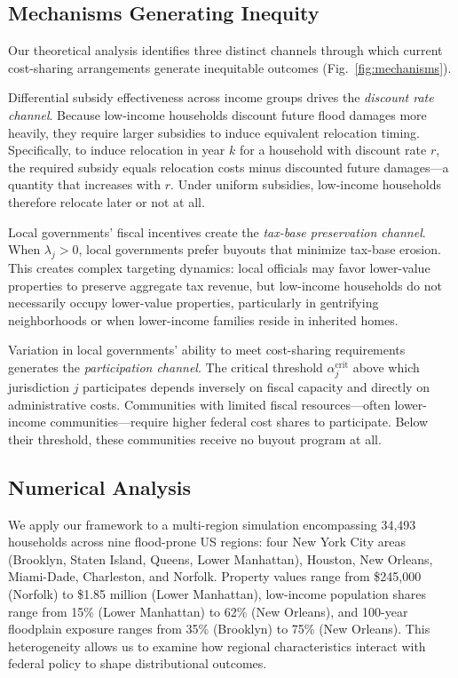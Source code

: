 \documentclass[11pt,letterpaper]{article}
\theoremstyle{definition}
\begin{document}
\subsection{Mechanisms Generating Inequity}

Our theoretical analysis identifies three distinct channels through which current cost-sharing arrangements generate inequitable outcomes (Fig.~\ref{fig:mechanisms}).

Differential subsidy effectiveness across income groups drives the \textit{discount rate channel}. Because low-income households discount future flood damages more heavily, they require larger subsidies to induce equivalent relocation timing. Specifically, to induce relocation in year $k$ for a household with discount rate $r$, the required subsidy equals relocation costs minus discounted future damages---a quantity that increases with $r$. Under uniform subsidies, low-income households therefore relocate later or not at all.

Local governments' fiscal incentives create the \textit{tax-base preservation channel}. When $\lambda_j > 0$, local governments prefer buyouts that minimize tax-base erosion. This creates complex targeting dynamics: local officials may favor lower-value properties to preserve aggregate tax revenue, but low-income households do not necessarily occupy lower-value properties, particularly in gentrifying neighborhoods or when lower-income families reside in inherited homes.

Variation in local governments' ability to meet cost-sharing requirements generates the \textit{participation channel}. The critical threshold $\alpha_j^{\text{crit}}$ above which jurisdiction $j$ participates depends inversely on fiscal capacity and directly on administrative costs. Communities with limited fiscal resources---often lower-income communities---require higher federal cost shares to participate. Below their threshold, these communities receive no buyout program at all.

\subsection{Numerical Analysis}

We apply our framework to a multi-region simulation encompassing 34,493 households across nine flood-prone US regions: four New York City areas (Brooklyn, Staten Island, Queens, Lower Manhattan), Houston, New Orleans, Miami-Dade, Charleston, and Norfolk. Property values range from \$245,000 (Norfolk) to \$1.85 million (Lower Manhattan), low-income population shares range from 15\% (Lower Manhattan) to 62\% (New Orleans), and 100-year floodplain exposure ranges from 35\% (Brooklyn) to 75\% (New Orleans). This heterogeneity allows us to examine how regional characteristics interact with federal policy to shape distributional outcomes.
\end{document}
